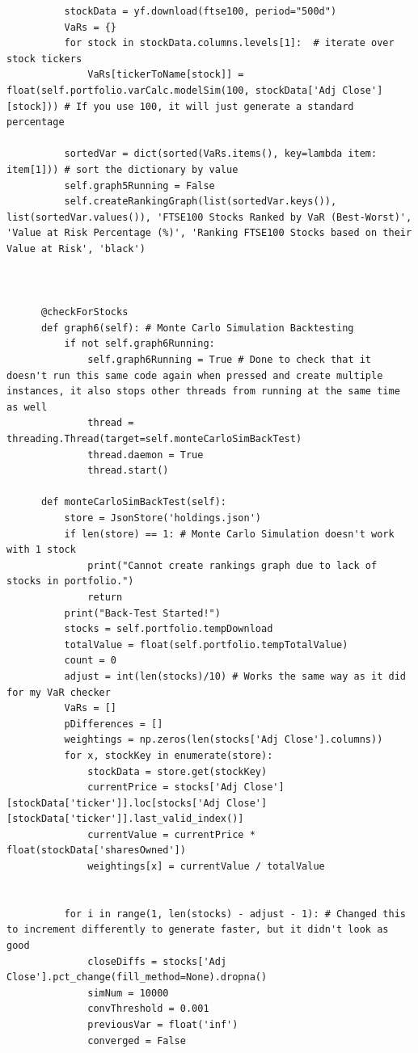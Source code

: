 \documentclass{article}
\begin{document}
\begin{verbatim}
          stockData = yf.download(ftse100, period="500d")
          VaRs = {}
          for stock in stockData.columns.levels[1]:  # iterate over stock tickers
              VaRs[tickerToName[stock]] = float(self.portfolio.varCalc.modelSim(100, stockData['Adj Close'][stock])) # If you use 100, it will just generate a standard percentage
      
          sortedVar = dict(sorted(VaRs.items(), key=lambda item: item[1])) # sort the dictionary by value
          self.graph5Running = False
          self.createRankingGraph(list(sortedVar.keys()), list(sortedVar.values()), 'FTSE100 Stocks Ranked by VaR (Best-Worst)', 'Value at Risk Percentage (%)', 'Ranking FTSE100 Stocks based on their Value at Risk', 'black')



      @checkForStocks
      def graph6(self): # Monte Carlo Simulation Backtesting
          if not self.graph6Running:
              self.graph6Running = True # Done to check that it doesn't run this same code again when pressed and create multiple instances, it also stops other threads from running at the same time as well
              thread = threading.Thread(target=self.monteCarloSimBackTest)
              thread.daemon = True
              thread.start()

      def monteCarloSimBackTest(self):
          store = JsonStore('holdings.json')
          if len(store) == 1: # Monte Carlo Simulation doesn't work with 1 stock
              print("Cannot create rankings graph due to lack of stocks in portfolio.")
              return
          print("Back-Test Started!")
          stocks = self.portfolio.tempDownload
          totalValue = float(self.portfolio.tempTotalValue)
          count = 0
          adjust = int(len(stocks)/10) # Works the same way as it did for my VaR checker
          VaRs = []
          pDifferences = []
          weightings = np.zeros(len(stocks['Adj Close'].columns))
          for x, stockKey in enumerate(store):
              stockData = store.get(stockKey)
              currentPrice = stocks['Adj Close'][stockData['ticker']].loc[stocks['Adj Close'][stockData['ticker']].last_valid_index()]
              currentValue = currentPrice * float(stockData['sharesOwned'])
              weightings[x] = currentValue / totalValue
          

          for i in range(1, len(stocks) - adjust - 1): # Changed this to increment differently to generate faster, but it didn't look as good
              closeDiffs = stocks['Adj Close'].pct_change(fill_method=None).dropna()
              simNum = 10000
              convThreshold = 0.001
              previousVar = float('inf')
              converged = False
      

\end{verbatim}
\end{document}
